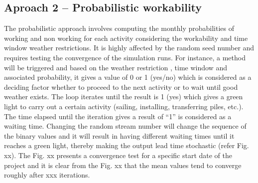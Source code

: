 \subsection{Aproach 2 -- Probabilistic workability}
The probabilistic approach involves computing the monthly probabilities of working and non working for each activity considering the workability and time window weather restrictions. It is highly affected by the random seed number and requires testing the convergence of the simulation runs. 
For instance, a method will be triggered and based on the weather restriction , time window and associated probability, it gives a value of 0 or 1 (yes/no) which is considered as a deciding factor whether to proceed to the next activity or to wait until good weather exists. The loop iterates until the result is 1 (yes) which gives a green light to carry out a certain activity (sailing, installing, transferring piles, etc.). The time elapsed until the iteration gives a result of “1” is considered as a waiting time. Changing the random stream number will change the sequence of the binary values and it will result in having different waiting times until it reaches a green light, thereby making the output lead time stochastic (refer Fig. xx). The Fig. xx presents a convergence test for a specific start date of the project and it is clear from the Fig. xx that the mean values tend to converge roughly after xxx iterations.